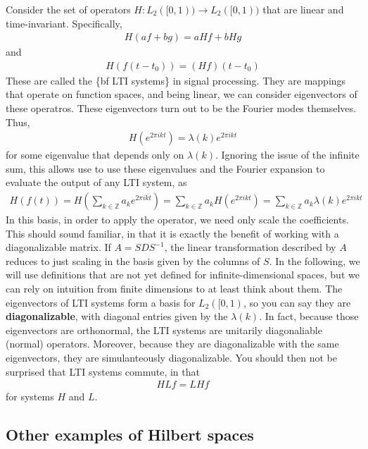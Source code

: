 \documentclass[11pt]{article}
\newcommand{\Z}{\ensuremath{\mathbb Z}}
\theoremstyle{plain}
\theoremstyle{definition}
\theoremstyle{remark}
\begin{document}
Consider the set of operators $H: L_2([0,1)) \rightarrow L_2([0,1))$ that are linear and time-invariant. Specifically,
\begin{align*}
    H(af + bg) = aHf + bHg
\end{align*}
and
\begin{align*}
    H(f(t-t_0)) = (Hf)(t - t_0)
\end{align*}
These are called the \{bf LTI systems\} in signal processing. They are mappings that operate on function spaces, and being linear, we can consider eigenvectors of these operatros. These eigenvectors turn out to be the Fourier modes themselves. Thus,
\begin{align*}
    H(e^{2\pi i k t}) = \lambda(k) e^{2\pi i k t}
\end{align*}
for some eigenvalue that depends only on $\lambda(k)$. Ignoring the issue of the infinite sum, this allows use to use these eigenvalues and the Fourier expansion to evaluate the output of any LTI system, as
\begin{align*}
    H(f(t)) = H\left(\sum_{k \in \Z} a_k e^{2\pi i k t}\right) = \sum_{k \in \Z} a_k H(e^{2\pi i k t}) = \sum_{k \in \Z} a_k \lambda(k) e^{2\pi i k t}
\end{align*}
In this basis, in order to apply the operator, we need only scale the coefficients. This should sound familiar, in that it is exactly the benefit of working with a diagonalizable matrix. If $A = SDS^{-1}$, the linear transformation described by $A$ reduces to just scaling in the basis given by the columns of $S$. In the following, we will use definitions that are not yet defined for infinite-dimensional spaces, but we can rely on intuition from finite dimensions to at least think about them. The eigenvectors of LTI systems form a basis for $L_2([0,1)$, so you can say they are {\bf diagonalizable}, with diagonal entries given by the $\lambda(k)$. In fact, because those eigenvectors are orthonormal, the LTI systems are unitarily diagonaliable (normal) operators. Moreover, because they are diagonalizable with the same eigenvectors, they are simulanteously diagonalizable. You should then not be surprised that LTI systems commute, in that
\begin{align*}
    HLf = LHf
\end{align*}
for systems $H$ and $L$.

\subsection*{Other examples of Hilbert spaces}
\end{document}

